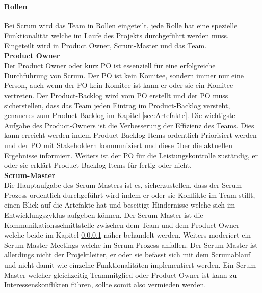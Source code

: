 	\paragraph{Rollen}
	\label{sec:Rollen}
		Bei Scrum wird das Team in Rollen eingeteilt, jede Rolle hat eine spezielle Funktionalität welche im Laufe des Projekts durchgeführt werden muss. Eingeteilt wird in Product Owner, Scrum-Master und das Team. \\

			\textbf{Product Owner} \\
			Der Product Owner oder kurz PO ist essenziell für eine erfolgreiche Durchführung von Scrum. Der PO ist kein Komitee, sondern immer nur eine Person, auch wenn der PO kein Komitee ist kann er oder sie ein Komitee vertreten. Der Product-Backlog wird vom PO erstellt und der PO muss sicherstellen, dass das Team jeden Eintrag im Product-Backlog versteht, genaueres zum Product-Backlog im Kapitel \ref{sec:Artefakte}. Die wichtigste Aufgabe des Product-Owners ist die Verbesserung der Effizienz des Teams. Dies kann erreicht werden indem Product-Backlog Items ordentlich Priorisiert werden und der PO mit Stakeholdern kommuniziert und diese über die aktuellen Ergebnisse informiert. Weiters ist der PO für die Leistungskontrolle zuständig, er oder sie erklärt Product-Backlog Items für fertig oder nicht. \textcite{ScrumProductOwner} \\ 
			
			\textbf{Scrum-Master} \\
			Die Hauptaufgabe des Scrum-Masters ist es, sicherzustellen, dass der Scrum-Prozess ordentlich durchgeführt wird indem er oder sie Konflikte im Team stillt, einen Blick auf die Artefakte hat und beseitigt Hindernisse welche sich im Entwicklungszyklus aufgeben können. Der Scrum-Master ist die Kommunikationsschnittstelle zwischen dem Team und dem Product-Owner welche beide im Kapitel \ref{sec:Rollen} näher behandelt werden. Weiters moderiert ein Scrum-Master Meetings welche im Scrum-Prozess anfallen. Der Scrum-Master ist allerdings nicht der Projektleiter, er oder sie befasst sich mit dem Scrumablauf und nicht damit wie einzelne   Funktionalitäten implementiert werden. Ein Scrum-Master welcher gleichzeitig Teammitglied oder Product-Owner ist kann zu Interessenskonflikten führen, sollte somit also vermieden werden. \textcite{ScrumScrumMaster} \\
			
